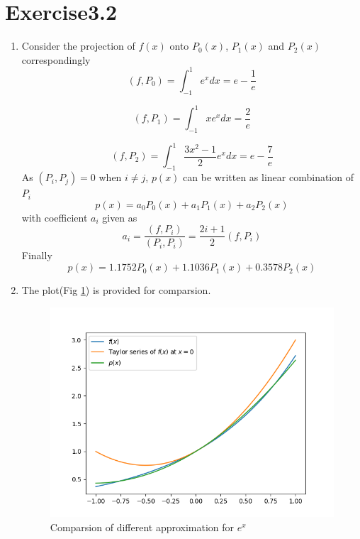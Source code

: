 \documentclass[paper=a4, fontsize=11pt]{scrartcl} %
\numberwithin{equation}{section} %
\numberwithin{figure}{section} %
\numberwithin{table}{section} %
\begin{document}
\section{Exercise3.2}
	\begin{enumerate}
		\item 
			Consider the projection of $f(x)$ onto $P_0(x)$, $P_1(x)$ and $P_2(x)$ correspondingly
			\begin{equation}
				(f, P_0) = \int_{-1}^{1} e^x dx = e - \frac{1}{e}
			\end{equation} 
			
			\begin{equation}
				(f, P_1) = \int_{-1}^{1} x e^x dx = \frac{2}{e}
			\end{equation}
			
			\begin{equation}
				(f, P_2) = \int_{-1}^{1} \frac{3x^2 -1}{2} e^x dx = e - \frac{7}{e}
			\end{equation}
			As $(P_i, P_j)=0$ when $i \neq j$, $p(x)$ can be written as linear combination of $P_i$
			\begin{equation}
				p(x) = a_0 P_0(x) + a_1 P_1(x) + a_2 P_2(x)
			\end{equation}
			with coefficient $a_i$ given as
			\begin{equation}
				a_i = \frac{(f, P_i)}{(P_i, P_i)} = \frac{2i+1}{2} (f, P_i)
			\end{equation}
			Finally
			\begin{equation}
				p(x) = 1.1752 P_0(x) + 1.1036 P_1(x) + 0.3578 P_2(x)
			\end{equation}
			
		\item 
		The plot(Fig \ref{fig:comp}) is provided for comparsion.
	
		\begin{figure}[!htbp]
			\centering
			\includegraphics[]{ApproximationCompare.png}
			\caption{Comparsion of different approximation for $e^x$}
			\label{fig:comp}
		\end{figure}
	

\end{enumerate}
\end{document}
